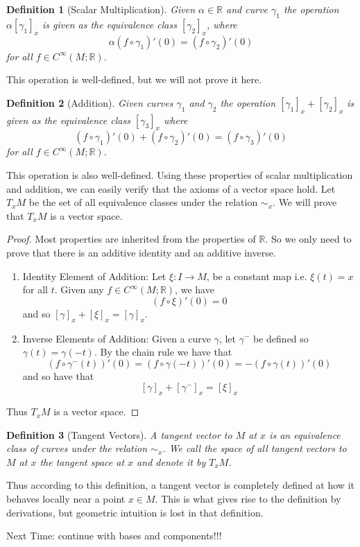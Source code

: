 \documentclass[a4paper]{article}
\newtheorem*{defn}{Definition}
\begin{document}
\begin{defn}[Scalar Multiplication]
  Given $\alpha \in \mathds{R}$ and curve $\gamma_1$ the operation $\alpha [\gamma_1]_x$ is given as the equivalence class $[\gamma_2]_x$, where
  \[
    \alpha (f \circ \gamma_1)'(0) =  (f \circ \gamma_2)'(0)
  \]
  for all $f \in C^\infty(M; \mathds{R})$.
\end{defn}

This operation is well-defined, but we will not prove it here.

\begin{defn}[Addition]
  Given curves $\gamma_1$ and $\gamma_2$ the operation $[\gamma_1]_x + [\gamma_2]_x$ is given as the equivalence class $[\gamma_3]_x$ where
  \[
    (f \circ \gamma_1)'(0) + (f \circ \gamma_2)'(0) = (f \circ \gamma_3)'(0)
  \]
  for all $f \in C^\infty(M; \mathds{R})$.
\end{defn}

This operation is also well-defined. Using these properties of scalar multiplication and addition, we can easily verify that the axioms of a vector space hold. Let $T_xM$ be the set of all equivalence classes under the relation $\sim_x$. We will prove that $T_xM$ is a vector space.

\begin{proof}
  Most properties are inherited from the properties of $\mathds{R}$. So we only need to prove that there is an additive identity and an additive inverse.
  \begin{enumerate}
    \item Identity Element of Addition: Let $\xi: I \rightarrow M$, be a constant map i.e. $\xi(t) = x$ for all $t$. Given any $f \in C^\infty(M; \mathds{R})$, we have
      \[
        (f \circ \xi)'(0) = 0
      \]
      and so $[\gamma]_x + [\xi]_x = [\gamma]_x$.
    \item Inverse Elements of Addition: Given a curve $\gamma$, let $\gamma^-$ be defined so $\gamma(t) = \gamma(-t)$. By the chain rule we have that
      \[
        (f \circ \gamma^-(t))'(0) = (f \circ \gamma(-t))'(0) = -(f \circ \gamma(t))'(0)
      \]
      and so have that
      \[
        \left[ \gamma \right]_x + \left[ \gamma^- \right]_x = \left[ \xi \right]_x
      \]
  \end{enumerate}
  Thus $T_xM$ is a vector space.
\end{proof}

\begin{defn}[Tangent Vectors]
 A tangent vector to $M$ at $x$ is an equivalence class of curves under the relation $\sim_x$. We call the space of all tangent vectors to $M$ at $x$ the tangent space at $x$ and denote it by $T_xM$.
\end{defn}

Thus according to this definition, a tangent vector is completely defined at how it behaves locally near a point $x \in M$. This is what gives rise to the definition by derivations, but geometric intuition is lost in that definition.

Next Time: continue with bases and components!!!
\end{document}
